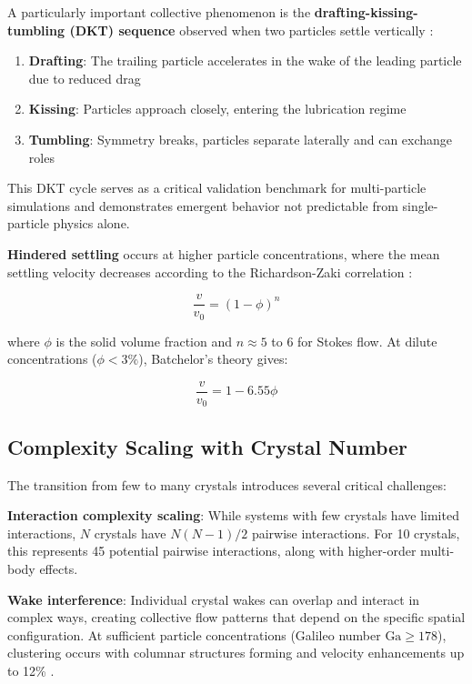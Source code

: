 A particularly important collective phenomenon is the \textbf{drafting-kissing-tumbling (DKT) sequence} observed when two particles settle vertically \cite{fortes1987nonlinear}:

\begin{enumerate}
    \item \textbf{Drafting}: The trailing particle accelerates in the wake of the leading particle due to reduced drag
    \item \textbf{Kissing}: Particles approach closely, entering the lubrication regime
    \item \textbf{Tumbling}: Symmetry breaks, particles separate laterally and can exchange roles
\end{enumerate}

This DKT cycle serves as a critical validation benchmark for multi-particle simulations and demonstrates emergent behavior not predictable from single-particle physics alone.

\textbf{Hindered settling} occurs at higher particle concentrations, where the mean settling velocity decreases according to the Richardson-Zaki correlation \cite{happel1983low}:

\begin{equation}
\frac{v}{v_0} = (1-\phi)^n
\label{eq:richardson_zaki}
\end{equation}

where $\phi$ is the solid volume fraction and $n \approx 5$ to 6 for Stokes flow. At dilute concentrations ($\phi < 3\%$), Batchelor's theory gives:

\begin{equation}
\frac{v}{v_0} = 1 - 6.55\phi
\end{equation}

\subsection{Complexity Scaling with Crystal Number}

The transition from few to many crystals introduces several critical challenges:

\textbf{Interaction complexity scaling}: While systems with few crystals have limited interactions, $N$ crystals have $N(N-1)/2$ pairwise interactions. For 10 crystals, this represents 45 potential pairwise interactions, along with higher-order multi-body effects.

\textbf{Wake interference}: Individual crystal wakes can overlap and interact in complex ways, creating collective flow patterns that depend on the specific spatial configuration. At sufficient particle concentrations (Galileo number $\text{Ga} \geq 178$), clustering occurs with columnar structures forming and velocity enhancements up to 12\% \cite{uhlmann2014clustering}.

